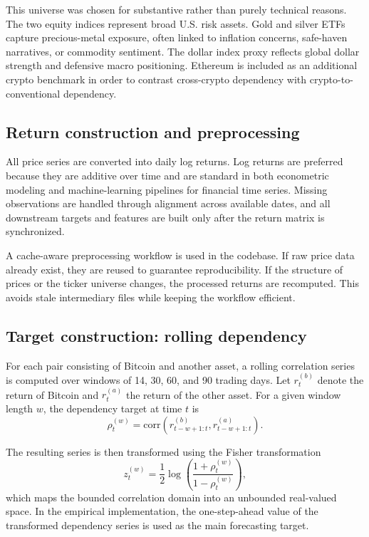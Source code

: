 This universe was chosen for substantive rather than purely technical reasons. The two equity indices represent broad U.S. risk assets. Gold and silver ETFs capture precious-metal exposure, often linked to inflation concerns, safe-haven narratives, or commodity sentiment. The dollar index proxy reflects global dollar strength and defensive macro positioning. Ethereum is included as an additional crypto benchmark in order to contrast cross-crypto dependency with crypto-to-conventional dependency.

\subsection{Return construction and preprocessing}

All price series are converted into daily log returns. Log returns are preferred because they are additive over time and are standard in both econometric modeling and machine-learning pipelines for financial time series. Missing observations are handled through alignment across available dates, and all downstream targets and features are built only after the return matrix is synchronized.

A cache-aware preprocessing workflow is used in the codebase. If raw price data already exist, they are reused to guarantee reproducibility. If the structure of prices or the ticker universe changes, the processed returns are recomputed. This avoids stale intermediary files while keeping the workflow efficient.

\subsection{Target construction: rolling dependency}

For each pair consisting of Bitcoin and another asset, a rolling correlation series is computed over windows of 14, 30, 60, and 90 trading days. Let $r_t^{(b)}$ denote the return of Bitcoin and $r_t^{(a)}$ the return of the other asset. For a given window length $w$, the dependency target at time $t$ is
\[
\rho_t^{(w)} = \text{corr}(r_{t-w+1:t}^{(b)}, r_{t-w+1:t}^{(a)}).
\]

The resulting series is then transformed using the Fisher transformation
\[
z_t^{(w)} = \frac{1}{2}\log\left(\frac{1 + \rho_t^{(w)}}{1 - \rho_t^{(w)}}\right),
\]
which maps the bounded correlation domain into an unbounded real-valued space. In the empirical implementation, the one-step-ahead value of the transformed dependency series is used as the main forecasting target.

